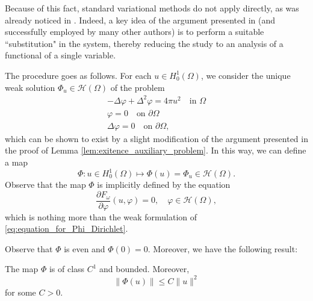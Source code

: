 \documentclass[reqno]{amsart}
\begin{document}
Because of this fact, standard variational methods do not apply directly, as was 
already noticed in \cite{BenciFortunato1998}. Indeed, a key idea of the argument 
presented in \cite{BenciFortunato1998} (and successfully employed by many other 
authors) is to perform a suitable ``substitution" in the system, thereby reducing 
the study to an analysis of a functional of a single variable.

The procedure goes as follows. For each $u \in H_0^1(\Omega)$, we consider the 
unique weak solution $\Phi_u \in \mathcal{H}(\Omega) $ of the problem
\begin{equation}
 \label{eq:equation_for_Phi_Dirichlet}
\begin{gathered}
 - \Delta \varphi + \Delta^2 \varphi  =  4 \pi u^2  \quad \text{in } \Omega \\
 \varphi  =  0  \quad \text{on } \partial\Omega \\
 \Delta \varphi  =  0  \quad \text{on } \partial\Omega,
 \end{gathered}
\end{equation}
which can be shown to exist by a slight modification of the argument presented 
in the proof of Lemma \ref{lem:exitence_auxiliary_problem}. 
In this way, we can define a map
\[
 \Phi: u \in H_0^1(\Omega) \mapsto \Phi(u) = \Phi_u \in \mathcal{H}(\Omega) .
\]
Observe that the map $\Phi$ is implicitly defined by the equation
\begin{equation}
 \label{eq:implicit_def_Phi_Dirichlet}
 \frac{\partial F_\omega}{\partial \varphi} (u, \varphi) = 0, \quad \varphi \in \mathcal{H}(\Omega) ,
\end{equation}
which is nothing more than the weak formulation of 
\eqref{eq:equation_for_Phi_Dirichlet}.

Observe that $\Phi$ is even and $\Phi(0) = 0$. Moreover, we have the following result:

\begin{lemma}
 \label{lem:map_Phi}
The map $\Phi$ is of class $C^1$ and bounded. Moreover,
 \begin{equation}
 \label{eq:bound_Phi}
 \|\Phi(u)\| \leq C\|u\|^2
 \end{equation}
 for some $C > 0$.
\end{lemma}
\end{document}
